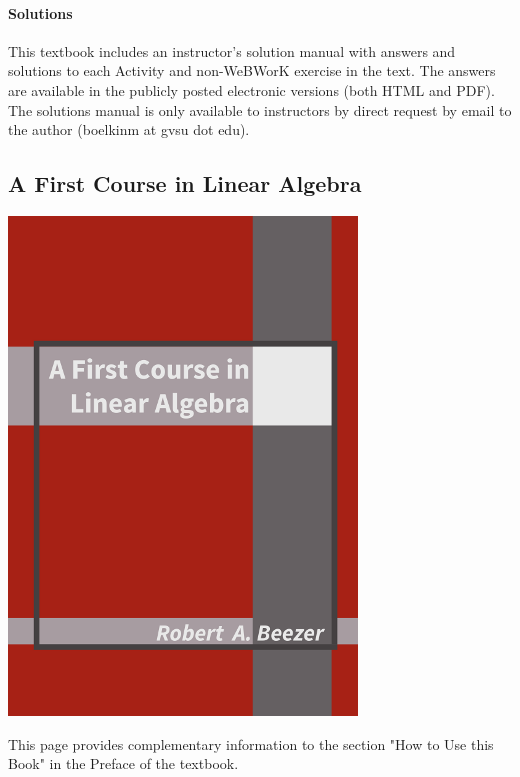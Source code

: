 \documentclass[10pt,]{article}
\begin{document}
\paragraph[{Solutions}]{Solutions}\hypertarget{paragraphs-10}{}
\hypertarget{p-26}{}%
This textbook includes an instructor's solution manual with answers and solutions to each Activity and non-WeBWorK exercise in the text. The answers are available in the publicly posted electronic versions (both HTML and PDF).  The solutions manual is only available to instructors by direct request by email to the author (boelkinm at gvsu dot edu).%
\typeout{************************************************}
\typeout{************************************************}
\subsection[{A First Course in Linear Algebra}]{A First Course in Linear Algebra}\label{subsection-fcla}
\leavevmode%
\begin{sidebyside}{2}{0.0125}{0.0125}{0.025}
\begin{sbspanel}{0.25}
\includegraphics[width=1\linewidth]{images/cover-fcla.png}
\end{sbspanel}
\begin{sbspanel}{0.7}
\hypertarget{p-27}{}%
This page provides complementary information to the section "How to Use this Book" in the Preface of the textbook. %
\end{sbspanel}
\end{sidebyside}
\end{document}
